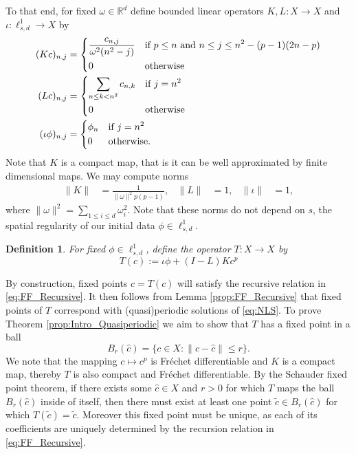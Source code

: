 \documentclass{article}
\newtheorem{definition}[theorem]{Definition}
\newcommand{\R}{\mathbb{R}}
\begin{document}
 To that end, for fixed $ \omega \in \R^d$  define bounded linear operators $K, L : X \to X $ and $ \iota:  \ell^1_{s,d}  \to X $  by 
	\begin{align*}
		(K c)_{n,j} &= 
		\begin{dcases}
			\frac{c_{n,j}}{\omega^2(n^2-j)} & \mbox{if } p \leq n \mbox{ and }  n \leq j \leq n^2 - (p-1)(2 n -p)  \\
			0 & \mbox{otherwise}
		\end{dcases} \\
		(L c)_{n,j} &= 
		\begin{dcases}
			\sum_{ n \leq k < n^2} c_{n,k} & \mbox{if } j = n^2 \\
			0 & \mbox{otherwise}
		\end{dcases}  \\
(\iota \phi)_{n,j} &= 
	\begin{dcases}
	\phi_n & \mbox{if } j = n^2 \\
	0 & \mbox{otherwise.}
	\end{dcases} 
	\end{align*}
Note that $K$ is a compact map, that is it can be well approximated by finite dimensional maps. We may compute  norms 
\begin{align*}
	\|K \| &=   \frac{1}{ \|\omega\|^2  p(p-1)},   
	&
	\|L\| &= 1,  
	&
	\| \iota\| &= 1,
\end{align*} 
where $\|\omega\|^2  = \sum_{1 \leq i \leq d} \omega_i^2$. 
Note that these norms do not depend on $s$, the spatial regularity of our initial data $ \phi \in \ell^1_{s,d}$.  

\begin{definition} \label{def:Newton_Map}
	For fixed  $ \phi \in \ell^1_{s,d}$, define the operator $T  : X \to X$ by
\[
T(c) := \iota \phi +  (I -L)K  c^p  
\]
\end{definition} 
By construction, fixed points $c=T(c) $ will satisfy the recursive relation in \eqref{eq:FF_Recursive}. 
It then follows from Lemma \ref{prop:FF_Recursive} that fixed points of $T$ correspond with (quasi)periodic solutions of \eqref{eq:NLS}. 
To prove Theorem \ref{prop:Intro_Quasiperiodic}  we aim to show that $T$ has a fixed point in a ball 
\[
B_r(\hat{c}) = \{ c \in X : \| c - \hat{c} \| \leq r \} . 
\]  
We note that the mapping $ c \mapsto c^p$ is Fr\'echet differentiable and $ K$ is a compact map, thereby $T$ is also compact and Fr\'echet differentiable.  
By the Schauder fixed point theorem, if there exists some $ \hat{c} \in X$ and $ r>0$  for which  $ T$ maps the ball $B_r(\hat{c})$ inside of itself, then there must exist at least one point  $ \tilde{c} \in B_r(\hat{c})$ for which $ T(\tilde{c}) = \tilde{c}$.  
Moreover this fixed point must be unique, as each of its coefficients are uniquely determined by the recursion relation in \eqref{eq:FF_Recursive}. 
\end{document}
